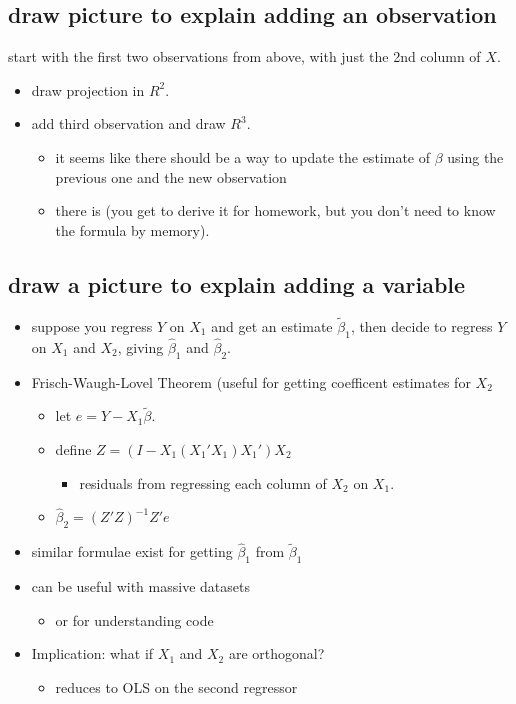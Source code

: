 \subsection{draw picture to explain adding an observation}
     start with the first two observations from above, with just the 2nd
     column of $X$.
\begin{itemize}
\item draw projection in $R^2$.
\item add third observation and draw $R^3$.
\begin{itemize}
\item it seems like there should be a way to update the estimate of
         $\beta$ using the previous one and the new observation
\item there is (you get to derive it for homework, but you don't need
         to know the formula by memory).
\end{itemize}
\end{itemize}

\subsection{draw a picture to explain adding a variable}

\begin{itemize}
\item suppose you regress $Y$ on $X_1$ and get an estimate
      $\tilde\beta_1$, then decide to regress $Y$ on $X_1$ and $X_2$,
      giving $\hat\beta_1$ and $\hat\beta_2$.
\item Frisch-Waugh-Lovel Theorem (useful for getting coefficent
      estimates for $X_2$
\begin{itemize}
\item let $e = Y - X_1\tilde \beta$.
\item define $Z = (I - X_1(X_1'X_1)X_1')X_2$
\begin{itemize}
\item residuals from regressing each column of $X_2$ on $X_1$.
\end{itemize}
\item $\hat\beta_2 = (Z'Z)^{-1}Z'e$
\end{itemize}
\item similar formulae exist for getting $\hat\beta_1$ from $\tilde
      \beta_1$
\item can be useful with massive datasets
\begin{itemize}
\item or for understanding code
\end{itemize}
\item Implication: what if $X_1$ and $X_2$ are orthogonal?
\begin{itemize}
\item reduces to OLS on the second regressor
\end{itemize}
\end{itemize}

